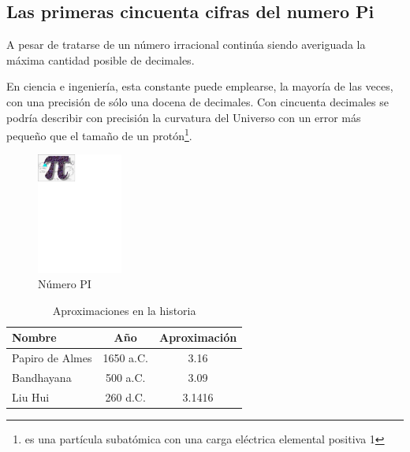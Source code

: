 \documentclass[spanish,a4paper,11pt]{article}
\begin{document}
\subsection{Las primeras cincuenta cifras del numero Pi}
A pesar de tratarse de un número irracional continúa siendo averiguada la máxima cantidad 
posible de decimales.\par
En ciencia e ingeniería, esta constante puede emplearse, la mayoría de las veces, con una 
precisión de sólo una docena de decimales. Con cincuenta decimales se podría describir con 
precisión la curvatura del Universo con un error más pequeño que el tamaño de un 
protón\footnote{es una partícula subatómica con una carga eléctrica elemental positiva 1 }.

\begin{figure}[!th]
\begin{center}
\includegraphics[width=0.25\textwidth]{images/figura2.eps}
\caption{Número PI}
\label{num_pi}
\end{center}
\end{figure}

\begin{table}[!ht]
\begin{tabular}{|l|c|c|}
\hline
Nombre & Año & Aproximación\\ \hline
Papiro de Almes & 1650 a.C. & 3.16\\ \hline
Bandhayana & 500 a.C. & 3.09\\ \hline
Liu Hui & 260 d.C. & 3.1416\\ \hline
\end{tabular}
\cite{educacion}
\caption{Aproximaciones en la historia}
\label{tabla}
\end{table}
\end{document}
